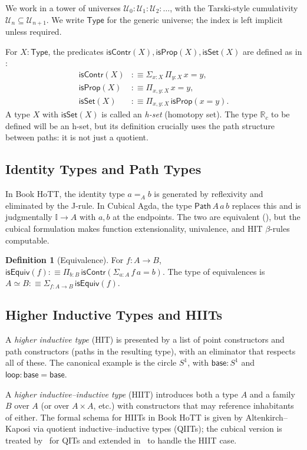 \documentclass[12pt]{article}
\theoremstyle{definition}
\newtheorem{definition}[theorem]{Definition}
\theoremstyle{remark}
\newcommand{\Type}{\mathsf{Type}}
\newcommand{\U}{\mathcal{U}}
\newcommand{\Rc}{\mathbb{R}_{c}}
\newcommand{\eqv}{\simeq}
\newcommand{\Path}{\mathsf{Path}}
\newcommand{\II}{\mathbb{I}}
\newcommand{\isContr}{\mathsf{isContr}}
\newcommand{\isProp}{\mathsf{isProp}}
\newcommand{\isSet}{\mathsf{isSet}}
\newcommand{\isEquiv}{\mathsf{isEquiv}}
\begin{document}
We work in a tower of universes
$\U_0 : \U_1 : \U_2 : \dots$, with the Tarski-style cumulativity
$\U_n \subseteq \U_{n+1}$. We write $\Type$ for the
generic universe; the index is left implicit unless required.

For $X : \Type$, the predicates
$\isContr(X), \isProp(X), \isSet(X)$ are defined as in
\cite[\S 3]{HoTTBook}:
\begin{align*}
\isContr(X) &:\equiv \Sigma_{x : X}\, \Pi_{y : X}\, x = y, \\
\isProp(X)  &:\equiv \Pi_{x, y : X}\, x = y, \\
\isSet(X)   &:\equiv \Pi_{x, y : X}\, \isProp(x = y).
\end{align*}
A type $X$ with $\isSet(X)$ is called an \emph{h-set} (homotopy set). The
type $\Rc$ to be defined will be an h-set, but its definition crucially
uses the path structure between paths: it is not just a quotient.

\subsection{Identity Types and Path Types}

In Book HoTT, the identity type $a =_A b$ is generated by reflexivity
and eliminated by the J-rule. In Cubical Agda, the type
$\Path\,A\,a\,b$ replaces this and is judgmentally
$\II \to A$ with $a, b$ at the endpoints. The two are
equivalent (\cite[\S 6]{CCHM}), but the cubical formulation makes
function extensionality, univalence, and HIT $\beta$-rules computable.

\begin{definition}[Equivalence]
\label{def:equiv}
For $f : A \to B$, $\isEquiv(f) :\equiv \Pi_{b : B}\, \isContr(\Sigma_{a : A}\, f\,a = b)$.
The type of equivalences is $A \eqv B :\equiv \Sigma_{f : A \to B}\, \isEquiv(f)$.
\end{definition}

\subsection{Higher Inductive Types and HIITs}

A \emph{higher inductive type} (HIT) is presented by a list of point
constructors and path constructors (paths in the resulting type), with
an eliminator that respects all of these. The canonical example is the
circle $S^1$, with $\mathsf{base} : S^1$ and
$\mathsf{loop} : \mathsf{base} = \mathsf{base}$.

A \emph{higher inductive--inductive type} (HIIT) introduces both a
type $A$ and a family $B$ over $A$ (or over $A \times A$, etc.) with
constructors that may reference inhabitants of either. The
formal schema for HIITs in Book HoTT is given by Altenkirch--Kaposi
\cite{AltenkirchKaposi} via quotient inductive--inductive types
(QIITs); the cubical version is treated by~\cite{CCHM} for QITs and
extended in~\cite{CubicalAgda} to handle the HIIT case.
\end{document}
